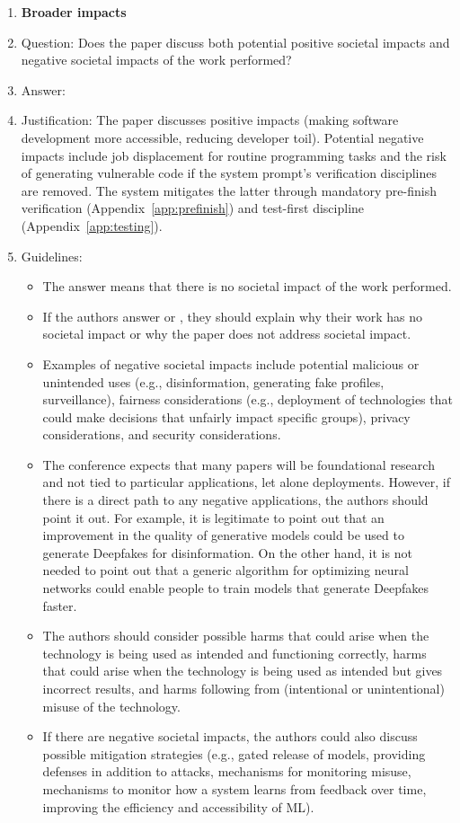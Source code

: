 \documentclass{article}
\begin{document}
\begin{enumerate}
\item {\bf Broader impacts}
    \item[] Question: Does the paper discuss both potential positive societal impacts and negative societal impacts of the work performed?
    \item[] Answer: \answerYes{}
    \item[] Justification: The paper discusses positive impacts (making software development more accessible, reducing developer toil). Potential negative impacts include job displacement for routine programming tasks and the risk of generating vulnerable code if the system prompt's verification disciplines are removed. The system mitigates the latter through mandatory pre-finish verification (Appendix~\ref{app:prefinish}) and test-first discipline (Appendix~\ref{app:testing}).
    \item[] Guidelines:
    \begin{itemize}
        \item The answer \answerNA{} means that there is no societal impact of the work performed.
        \item If the authors answer \answerNA{} or \answerNo{}, they should explain why their work has no societal impact or why the paper does not address societal impact.
        \item Examples of negative societal impacts include potential malicious or unintended uses (e.g., disinformation, generating fake profiles, surveillance), fairness considerations (e.g., deployment of technologies that could make decisions that unfairly impact specific groups), privacy considerations, and security considerations.
        \item The conference expects that many papers will be foundational research and not tied to particular applications, let alone deployments. However, if there is a direct path to any negative applications, the authors should point it out. For example, it is legitimate to point out that an improvement in the quality of generative models could be used to generate Deepfakes for disinformation. On the other hand, it is not needed to point out that a generic algorithm for optimizing neural networks could enable people to train models that generate Deepfakes faster.
        \item The authors should consider possible harms that could arise when the technology is being used as intended and functioning correctly, harms that could arise when the technology is being used as intended but gives incorrect results, and harms following from (intentional or unintentional) misuse of the technology.
        \item If there are negative societal impacts, the authors could also discuss possible mitigation strategies (e.g., gated release of models, providing defenses in addition to attacks, mechanisms for monitoring misuse, mechanisms to monitor how a system learns from feedback over time, improving the efficiency and accessibility of ML).
    \end{itemize}
    

\end{enumerate}
\end{document}
